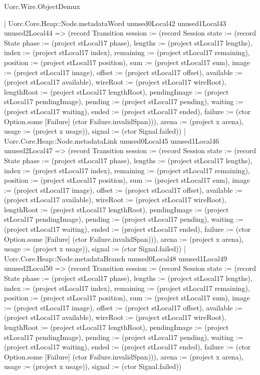 \begin{lexlean}{Uorc.Wire.ObjectDemux}
\begin{semanticmodule}
{        | Uorc.Core.Heap::Node.metadataWord unused0Local42 unused1Local43 unused2Local44 => (record Transition {session := (record Session {state := (record State {phase := (project stLocal17 phase), lengths := (project stLocal17 lengths), index := (project stLocal17 index), remaining := (project stLocal17 remaining), position := (project stLocal17 position), sum := (project stLocal17 sum), image := (project stLocal17 image), offset := (project stLocal17 offset), available := (project stLocal17 available), wireRoot := (project stLocal17 wireRoot), lengthRoot := (project stLocal17 lengthRoot), pendingImage := (project stLocal17 pendingImage), pending := (project stLocal17 pending), waiting := (project stLocal17 waiting), ended := (project stLocal17 ended), failure := (ctor Option.some [Failure] (ctor Failure.invalidSpan))}), arena := (project x arena), usage := (project x usage)}), signal := (ctor Signal.failed)})
        | Uorc.Core.Heap::Node.metadataLink unused0Local45 unused1Local46 unused2Local47 => (record Transition {session := (record Session {state := (record State {phase := (project stLocal17 phase), lengths := (project stLocal17 lengths), index := (project stLocal17 index), remaining := (project stLocal17 remaining), position := (project stLocal17 position), sum := (project stLocal17 sum), image := (project stLocal17 image), offset := (project stLocal17 offset), available := (project stLocal17 available), wireRoot := (project stLocal17 wireRoot), lengthRoot := (project stLocal17 lengthRoot), pendingImage := (project stLocal17 pendingImage), pending := (project stLocal17 pending), waiting := (project stLocal17 waiting), ended := (project stLocal17 ended), failure := (ctor Option.some [Failure] (ctor Failure.invalidSpan))}), arena := (project x arena), usage := (project x usage)}), signal := (ctor Signal.failed)})
        | Uorc.Core.Heap::Node.metadataBranch unused0Local48 unused1Local49 unused2Local50 => (record Transition {session := (record Session {state := (record State {phase := (project stLocal17 phase), lengths := (project stLocal17 lengths), index := (project stLocal17 index), remaining := (project stLocal17 remaining), position := (project stLocal17 position), sum := (project stLocal17 sum), image := (project stLocal17 image), offset := (project stLocal17 offset), available := (project stLocal17 available), wireRoot := (project stLocal17 wireRoot), lengthRoot := (project stLocal17 lengthRoot), pendingImage := (project stLocal17 pendingImage), pending := (project stLocal17 pending), waiting := (project stLocal17 waiting), ended := (project stLocal17 ended), failure := (ctor Option.some [Failure] (ctor Failure.invalidSpan))}), arena := (project x arena), usage := (project x usage)}), signal := (ctor Signal.failed)})
}
\end{semanticmodule}
\end{lexlean}
